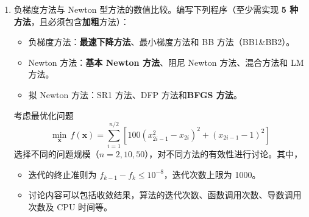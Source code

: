 \documentclass[cn,a4paper,12pt,founder,mtpro2]{elegantpaper}
\begin{document}
\begin{enumerate}
    \item 负梯度方法与 Newton 型方法的数值比较。编写下列程序（至少需实现 \textbf{5 种方法}，且必须包含\textbf{加粗}方法）：
          \begin{itemize}
              \item 负梯度方法：\textbf{最速下降方法}、最小梯度方法和 BB 方法（BB1\&BB2）。
              \item Newton 方法：\textbf{基本 Newton 方法}、阻尼 Newton 方法、混合方法和 LM 方法。
              \item 拟 Newton 方法：SR1 方法、DFP 方法和\textbf{BFGS 方法}。
          \end{itemize}

          考虑最优化问题
          \begin{equation}
              \min_{\mathbf{x}}\,f(\mathbf{x})=\sum_{i=1}^{n/2}\left[100\left(x_{2i-1}^{2}-x_{2i}\right)^{2}+\left(x_{2i-1}-1\right)^{2}\right]
          \end{equation}
          选择不同的问题规模（$n=2,10,50$），对不同方法的有效性进行讨论。其中，
          \begin{itemize}
              \item 迭代的终止准则为 $f_{k-1}-f_{k}\leq 10^{-8}$，迭代次数上限为 1000。
              \item 讨论内容可以包括收敛结果，算法的迭代次数、函数调用次数、导数调用次数及 CPU 时间等。
          \end{itemize}


\end{enumerate}
\end{document}
